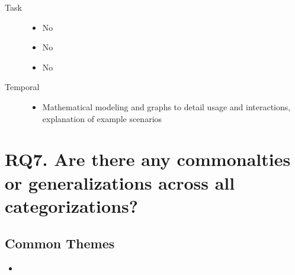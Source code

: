 \documentclass[letterpaper,10pt,english]{sphinxmanual}
\begin{document}
\begin{description}
\begin{itemize}
\end{itemize}

\item[{Task}] \leavevmode\begin{itemize}
\item {} 
No

\item {} 
No

\item {} 
No

\end{itemize}

\item[{Temporal}] \leavevmode\begin{itemize}
\item {} 
Mathematical modeling and graphs to detail usage and interactions, explanation of example scenarios

\end{itemize}

\end{description}


\chapter{RQ7. Are there any commonalties or generalizations across all categorizations?}
\label{research_questions/RQ_7:rq7-are-there-any-commonalties-or-generalizations-across-all-categorizations}\label{research_questions/RQ_7::doc}

\section{Common Themes}
\label{research_questions/RQ_7:common-themes}\begin{itemize}
\item {} 
\end{itemize}
\end{document}
